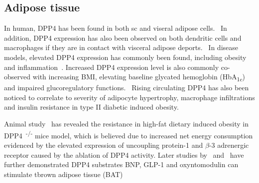 \subsection{Adipose tissue}
In human, DPP4 has been found in both sc and viseral adipose cells.~\cite{Lamers2011} In addition, DPP4 expression has also been observed on both dendritic cells and macrophages if they are in contact with visceral adipose deports.~\cite{Zhong2013} In disease models, elevated DPP4 expression has commonly been found, including obesity and inflammation~\cite{Zhong2013}. Increased DPP4 expression level is also commonly co-observed with increasing BMI, elevating baseline glycated hemoglobin (HbA\textsubscript{1c})~\cite{2011} and impaired glucoregulatory functions.~\cite{Zhong2013,Sell2013} Rising circulating DPP4 has also been noticed to correlate to severity of adipocyte hypertrophy, macrophage infiltrations and insulin resistance in type II diabetic induced obesity.~\cite{Sell2013}  
\par 
Animal study~\cite{Conarello2003} has revealed the resistance in high-fat dietary induced obesity in DPP4~\textsuperscript{-/-} mice model, which is believed due to increased net energy consumption evidenced by the elevated expression of uncoupling protein-1 and $\beta$-3 adrenergic receptor caused by the ablation of DPP4 activity. Later studies by~\citet{Bordicchia2012} and~\citet{Lockie2012} have further demonstrated DPP4 substrates BNP, GLP-1 and oxyntomodulin can stimulate tbrown adipose tissue (BAT)